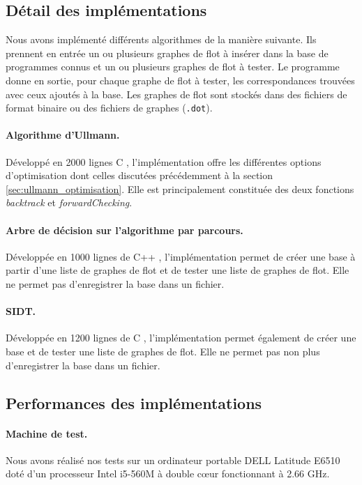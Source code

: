 \subsection{Détail des implémentations}
Nous avons implémenté différents algorithmes de la manière suivante. Ils prennent en entrée un ou plusieurs graphes de flot à insérer dans la base de programmes connus et un ou plusieurs graphes de flot à tester.
Le programme donne en sortie, pour chaque graphe de flot à tester, les correspondances trouvées avec ceux ajoutés à la base.
Les graphes de flot sont stockés dans des fichiers de format binaire ou des fichiers de graphes (\texttt{.dot}).

\paragraph{Algorithme d'Ullmann.}
Développé en 2000 lignes C \cite{graphbinalgo}, l'implémentation offre les différentes options d'optimisation dont celles discutées précédemment à la section \ref{sec:ullmann_optimisation}.
Elle est principalement constituée des deux fonctions \emph{backtrack} et \emph{forwardChecking}.

\paragraph{Arbre de décision sur l'algorithme par parcours.}
Développée en 1000 lignes de C++ \cite{GTSI}, l'implémentation permet de créer une base à partir d'une liste de graphes de flot et de tester une liste de graphes de flot. Elle ne permet pas d'enregistrer la base dans un fichier.

\paragraph{SIDT.}
Développée en 1200 lignes de C \cite{SIDT}, l'implémentation permet également de créer une base et de tester une liste de graphes de flot. Elle ne permet pas non plus d'enregistrer la base dans un fichier.


\subsection{Performances des implémentations}
\paragraph{Machine de test.}
Nous avons réalisé nos tests sur un ordinateur portable DELL Latitude E6510 doté d'un processeur Intel i5-560M à double c\oe ur fonctionnant à 2.66 GHz.

